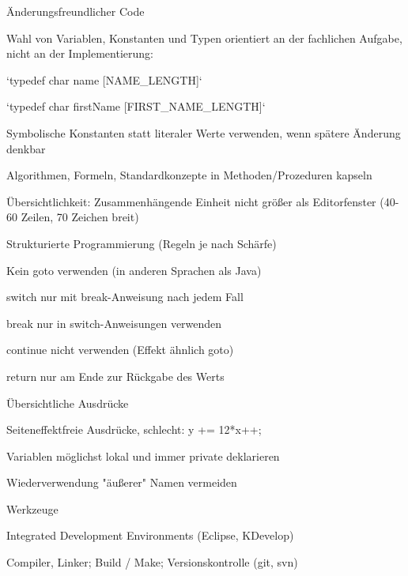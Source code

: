 \documentclass[a4paper]{article}
\begin{document}
\begin{multicols}{3}
  Änderungsfreundlicher Code
  \begin{itemize*}
    \item Wahl von Variablen, Konstanten und Typen orientiert an der fachlichen Aufgabe, nicht an der Implementierung:
    \begin{itemize*}
      \item `typedef char name [NAME\_LENGTH]`
      \item `typedef char firstName [FIRST\_NAME\_LENGTH]`
    \end{itemize*}
    \item Symbolische Konstanten statt literaler Werte verwenden, wenn spätere Änderung denkbar
    \item Algorithmen, Formeln, Standardkonzepte in Methoden/Prozeduren kapseln
    \item Übersichtlichkeit: Zusammenhängende Einheit nicht größer als Editorfenster (40-60 Zeilen, 70 Zeichen breit)
    \item Strukturierte Programmierung (Regeln je nach Schärfe)
    \begin{itemize*}
      \item Kein goto verwenden (in anderen Sprachen als Java)
      \item switch nur mit break-Anweisung nach jedem Fall
      \item break nur in switch-Anweisungen verwenden
      \item continue nicht verwenden (Effekt ähnlich goto)
      \item return nur am Ende zur Rückgabe des Werts
    \end{itemize*}
    \item Übersichtliche Ausdrücke
    \begin{itemize*}
      \item Seiteneffektfreie Ausdrücke, schlecht: y += 12*x++;
    \end{itemize*}
    \item Variablen möglichst lokal und immer private deklarieren
    \item Wiederverwendung "äußerer" Namen vermeiden
  \end{itemize*}

  Werkzeuge
  \begin{itemize*}
    \item Integrated Development Environments (Eclipse, KDevelop)
    \item Compiler, Linker; Build / Make; Versionskontrolle (git, svn)
  \end{itemize*}


\end{multicols}
\end{document}
